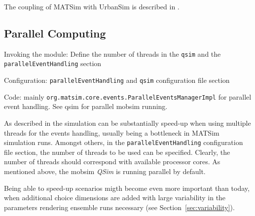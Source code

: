 The coupling of MATSim with UrbanSim \citep[][]{Waddell_unpub_UrbanSimTutorial_2010} is described in \citet[][]{NicolaiEtAl_TechRep_VSP_2011,NicolaiEtAl_ERSA_2011}.

\subsection{Parallel Computing}
\label{sec:parallelcomputing}
\begin{compactitem}
\item Invoking the module: Define the number of threads in the \lstinline|qsim| and the \lstinline|parallelEventHandling| section
\item Configuration: \lstinline|parallelEventHandling| and \lstinline|qsim| configuration file section
\item Code: mainly \lstinline|org.matsim.core.events.ParallelEventsManagerImpl| for parallel event handling. See qsim for parallel mobsim running.
\end{compactitem}

As described in \citet[][]{WaraichEtAl_TechRep_IVT_2009, WaraichEtAl_STRC_2009} the simulation can be substantially speed-up when using multiple threads for the events handling, usually being a bottleneck in MATSim simulation runs. Amongst others, in the \lstinline|parallelEventHandling| configuration file section, the number of threads to be used can be specified. Clearly, the number of threads should correspond with available processor cores. As mentioned above, the mobsim \emph{QSim} is running parallel by default.

Being able to speed-up scenarios migth become even more important than today, when additional choice dimensions are added with large variability in the parameters rendering ensemble runs necessary (see Section~\ref{sec:variability}).



